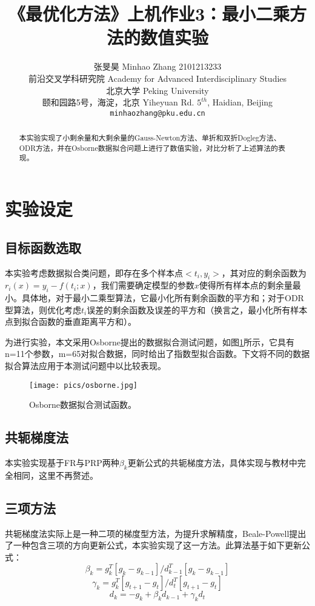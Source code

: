 \documentclass{article}
\title{《最优化方法》上机作业3：最小二乘方法的数值实验}
\author{%
  张旻昊 Minhao Zhang 2101213233 \\
  前沿交叉学科研究院 Academy for Advanced Interdisciplinary Studies\\
  北京大学 Peking University\\
  颐和园路5号，海淀，北京 Yiheyuan Rd. $5^{th}$, Haidian, Beijing\\
  \texttt{minhaozhang@pku.edu.cn} \\
}
\begin{document}

\maketitle

\begin{abstract}
  本实验实现了小剩余量和大剩余量的Gauss-Newton方法、单折和双折Dogleg方法、ODR方法，并在Osborne数据拟合问题上进行了数值实验，对比分析了上述算法的表现。
  
\end{abstract}

\section{实验设定}
\subsection{目标函数选取}
本实验考虑数据拟合类问题，即存在多个样本点$<t_i, y_i>$，其对应的剩余函数为$r_i(x) = y_i-f(t_i;x)$，我们需要确定模型的参数$x$使得所有样本点的剩余量最小。具体地，对于最小二乘型算法，它最小化所有剩余函数的平方和；对于ODR型算法，则优化考虑$t_i$误差的剩余函数及误差的平方和（换言之，最小化所有样本点到拟合函数的垂直距离平方和）。

为进行实验，本文采用Osborne提出的数据拟合测试问题，如图\ref{fig:osborne}所示，它具有n=11个参数，m=65对拟合数据，同时给出了指数型拟合函数。下文将不同的数据拟合算法应用于本测试问题中以比较表现。

\begin{figure}[h]
  \centering
  \texttt{[image: pics/osborne.jpg]}
  \caption{Osborne数据拟合测试函数。}
  \label{fig:osborne}
\end{figure}

\subsection{共轭梯度法}
本实验实现基于FR与PRP两种$\beta_k$更新公式的共轭梯度方法，具体实现与教材中完全相同，这里不再赘述。

\subsection{三项方法}
共轭梯度法实际上是一种二项的梯度型方法，为提升求解精度，Beale-Powell提出了一种包含三项的方向更新公式，本实验实现了这一方法。此算法基于如下更新公式：
\[ \beta_k = g_k^T [g_k - g_{k-1}] / d_{k-1}^T [g_k - g_{k-1}] \]
\[ \gamma_k = g_k^T [g_{t+1} - g_t] / d_t^T [g_{t+1} - g_t] \]
\[ d_k = -g_k + \beta_k d_{k-1} + \gamma_k d_{t} \]
\end{document}
